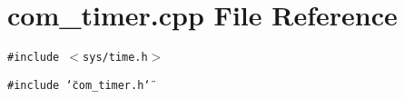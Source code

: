 \section{com\_\-timer.cpp File Reference}
\label{com__timer_8cpp}
{\tt \#include $<$sys/time.h$>$}\par
{\tt \#include \char`\"{}com\_\-timer.h\char`\"{}}\par
